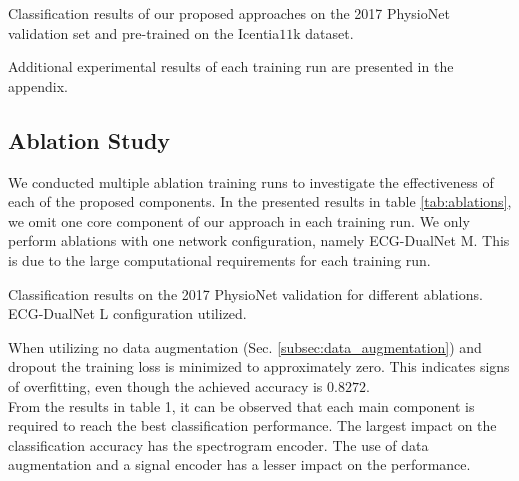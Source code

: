 \begin{table}[!ht]
    \centering
    \caption{Classification results of our proposed approaches on the 2017 PhysioNet validation set and pre-trained on the Icentia$11$k dataset.}
    
    \label{tab:pretraining_results}
\end{table}

Additional experimental results of each training run are presented in the appendix.

\subsection{Ablation Study} \label{subsec:ablations}

We conducted multiple ablation training runs to investigate the effectiveness of each of the proposed components. In the presented results in table \ref{tab:ablations}, we omit one core component of our approach in each training run. We only perform ablations with one network configuration, namely ECG-DualNet M. This is due to the large computational requirements for each training run.

\begin{table}[h!]
    \centering
    \caption{Classification results on the 2017 PhysioNet validation for different ablations. ECG-DualNet L configuration utilized.}
    
    \label{tab:ablations}
\end{table}

When utilizing no data augmentation (Sec. \ref{subsec:data_augmentation}) and dropout the training loss is minimized to approximately zero. This indicates signs of overfitting, even though the achieved accuracy is $0.8272$.\\
\indent From the results in table 1, it can be observed that each main component is required to reach the best classification performance. The largest impact on the classification accuracy has the spectrogram encoder. The use of data augmentation and a signal encoder has a lesser impact on the performance. 
